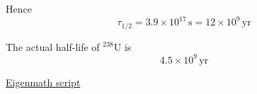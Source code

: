 Hence
\begin{equation*}
\tau_{1/2}=3.9\times10^{17}\,\text{s}=12\times10^9\,\text{yr}
\end{equation*}

The actual half-life of ${}^{238}\mathrm U$ is
\begin{equation*}
4.5\times10^9\,\text{yr}
\end{equation*}

\href{https://georgeweigt.github.io/examples/alpha-decay-2-demo.html}{Eigenmath script}



